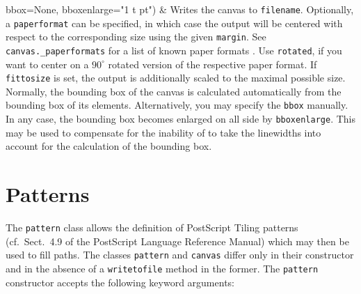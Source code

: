 \begin{tabularx}
{      \newline\phantom{writetofile(}bbox=None,
      \newline\phantom{writetofile(}bboxenlarge="1 t pt")} &
  Writes the canvas to \texttt{filename}. Optionally, a
  \texttt{paperformat} can be specified, in which case the output will
  be centered with respect to the corresponding size using the given
  \texttt{margin}. See \texttt{canvas.\_paperformats} for a list of
  known paper formats . Use \texttt{rotated}, if you want to center on
  a $90^\circ$ rotated version of the respective paper format. If
  \texttt{fittosize} is set, the output is additionally scaled to the
  maximal possible size. Normally, the bounding box of the canvas is 
  calculated automatically from the bounding box of its elements.
  Alternatively, you may specify the \texttt{bbox} manually. In any
  case, the bounding box becomes enlarged on all side by
  \texttt{bboxenlarge}. This may be used to compensate for the
  inability of \PyX{} to take the linewidths into account for the
  calculation of the bounding box.
\end{tabularx} 
\medskip

\section{Patterns}

The \texttt{pattern} class allows the definition of PostScript Tiling
patterns (cf.\ Sect.~4.9 of the PostScript Language Reference Manual)
which may then be used to fill paths. The classes \texttt{pattern} and
\texttt{canvas} differ only in their constructor and in the absence of
a \texttt{writetofile} method in the former. The \texttt{pattern}
constructor accepts the following keyword arguments:

